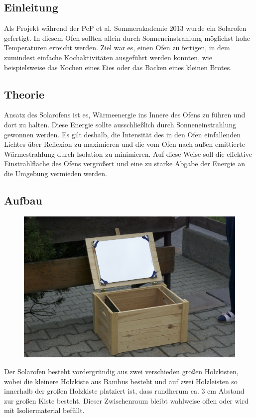 \subsection{Einleitung}
\label{sub:einleitung}
Als Projekt während der PeP et al. Sommerakademie 2013 wurde ein Solarofen gefertigt. 
In diesem Ofen sollten allein durch Sonneneinstrahlung möglichst hohe Temperaturen erreicht werden.
Ziel war es, einen Ofen zu fertigen, in dem zumindest einfache Kochaktivitäten ausgeführt werden konnten, wie beispielsweise das Kochen eines Eies oder das Backen eines kleinen Brotes.

\subsection{Theorie} 
\label{sub:theorie}
Ansatz des Solarofens ist es, Wärmeenergie ins Innere des Ofens zu führen und dort zu halten. 
Diese Energie sollte ausschließlich durch Sonneneinstrahlung gewonnen werden.
Es gilt deshalb, die Intensität des in den Ofen einfallenden Lichtes über Reflexion zu maximieren und die vom Ofen nach außen emittierte Wärmestrahlung durch Isolation zu minimieren.
Auf diese Weise soll die effektive Einstrahlfläche des Ofens vergrößert und eine zu starke Abgabe der Energie an die Umgebung vermieden werden.

\subsection{Aufbau}
\begin{figure}
\centering
\includegraphics[width=\textwidth]{figs/ofen/DSC_1591}
\end{figure}

Der Solarofen besteht vordergründig aus zwei verschieden großen Holzkisten, wobei die kleinere Holzkiste aus Bambus besteht und auf zwei Holzleisten so innerhalb der großen Holzkiste platziert ist, dass rundherum ca. 3 cm Abstand zur großen Kiste besteht.
Dieser Zwischenraum bleibt wahlweise offen oder wird mit Isoliermaterial befüllt.

